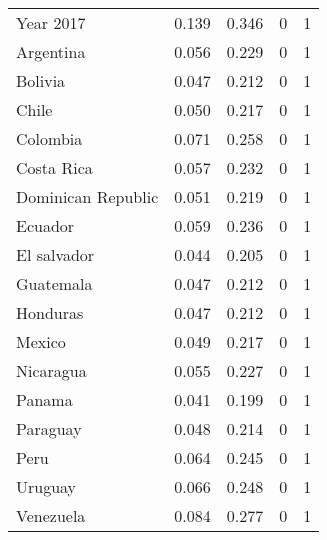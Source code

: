 {\begin{tabularx}{\textwidth}{X D{.}{.}{-3} D{.}{.}{-3} D{.}{.}{-3} D{.}{.}{-3} }
Year 2017 & 0.139 & 0.346 & 0 & 1 \\ 
Argentina & 0.056 & 0.229 & 0 & 1 \\ 
Bolivia & 0.047 & 0.212 & 0 & 1 \\ 
Chile & 0.050 & 0.217 & 0 & 1 \\ 
Colombia & 0.071 & 0.258 & 0 & 1 \\ 
Costa Rica & 0.057 & 0.232 & 0 & 1 \\ 
Dominican Republic & 0.051 & 0.219 & 0 & 1 \\ 
Ecuador & 0.059 & 0.236 & 0 & 1 \\ 
El salvador & 0.044 & 0.205 & 0 & 1 \\ 
Guatemala & 0.047 & 0.212 & 0 & 1 \\ 
Honduras & 0.047 & 0.212 & 0 & 1 \\ 
Mexico & 0.049 & 0.217 & 0 & 1 \\ 
Nicaragua & 0.055 & 0.227 & 0 & 1 \\ 
Panama & 0.041 & 0.199 & 0 & 1 \\ 
Paraguay & 0.048 & 0.214 & 0 & 1 \\ 
Peru & 0.064 & 0.245 & 0 & 1 \\ 
Uruguay & 0.066 & 0.248 & 0 & 1 \\ 
Venezuela & 0.084 & 0.277 & 0 & 1 \\ 
\bottomrule 
\end{tabularx}
}